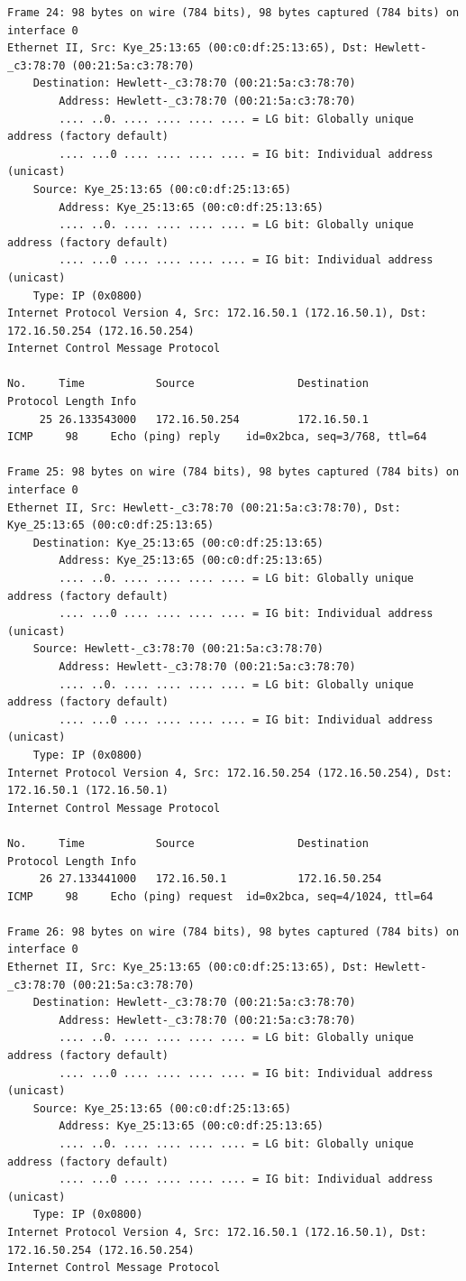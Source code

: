 \documentclass[a4paper,11pt]{article}
\begin{document}
\begin{lstlisting}
Frame 24: 98 bytes on wire (784 bits), 98 bytes captured (784 bits) on interface 0
Ethernet II, Src: Kye_25:13:65 (00:c0:df:25:13:65), Dst: Hewlett-_c3:78:70 (00:21:5a:c3:78:70)
    Destination: Hewlett-_c3:78:70 (00:21:5a:c3:78:70)
        Address: Hewlett-_c3:78:70 (00:21:5a:c3:78:70)
        .... ..0. .... .... .... .... = LG bit: Globally unique address (factory default)
        .... ...0 .... .... .... .... = IG bit: Individual address (unicast)
    Source: Kye_25:13:65 (00:c0:df:25:13:65)
        Address: Kye_25:13:65 (00:c0:df:25:13:65)
        .... ..0. .... .... .... .... = LG bit: Globally unique address (factory default)
        .... ...0 .... .... .... .... = IG bit: Individual address (unicast)
    Type: IP (0x0800)
Internet Protocol Version 4, Src: 172.16.50.1 (172.16.50.1), Dst: 172.16.50.254 (172.16.50.254)
Internet Control Message Protocol

No.     Time           Source                Destination           Protocol Length Info
     25 26.133543000   172.16.50.254         172.16.50.1           ICMP     98     Echo (ping) reply    id=0x2bca, seq=3/768, ttl=64

Frame 25: 98 bytes on wire (784 bits), 98 bytes captured (784 bits) on interface 0
Ethernet II, Src: Hewlett-_c3:78:70 (00:21:5a:c3:78:70), Dst: Kye_25:13:65 (00:c0:df:25:13:65)
    Destination: Kye_25:13:65 (00:c0:df:25:13:65)
        Address: Kye_25:13:65 (00:c0:df:25:13:65)
        .... ..0. .... .... .... .... = LG bit: Globally unique address (factory default)
        .... ...0 .... .... .... .... = IG bit: Individual address (unicast)
    Source: Hewlett-_c3:78:70 (00:21:5a:c3:78:70)
        Address: Hewlett-_c3:78:70 (00:21:5a:c3:78:70)
        .... ..0. .... .... .... .... = LG bit: Globally unique address (factory default)
        .... ...0 .... .... .... .... = IG bit: Individual address (unicast)
    Type: IP (0x0800)
Internet Protocol Version 4, Src: 172.16.50.254 (172.16.50.254), Dst: 172.16.50.1 (172.16.50.1)
Internet Control Message Protocol

No.     Time           Source                Destination           Protocol Length Info
     26 27.133441000   172.16.50.1           172.16.50.254         ICMP     98     Echo (ping) request  id=0x2bca, seq=4/1024, ttl=64

Frame 26: 98 bytes on wire (784 bits), 98 bytes captured (784 bits) on interface 0
Ethernet II, Src: Kye_25:13:65 (00:c0:df:25:13:65), Dst: Hewlett-_c3:78:70 (00:21:5a:c3:78:70)
    Destination: Hewlett-_c3:78:70 (00:21:5a:c3:78:70)
        Address: Hewlett-_c3:78:70 (00:21:5a:c3:78:70)
        .... ..0. .... .... .... .... = LG bit: Globally unique address (factory default)
        .... ...0 .... .... .... .... = IG bit: Individual address (unicast)
    Source: Kye_25:13:65 (00:c0:df:25:13:65)
        Address: Kye_25:13:65 (00:c0:df:25:13:65)
        .... ..0. .... .... .... .... = LG bit: Globally unique address (factory default)
        .... ...0 .... .... .... .... = IG bit: Individual address (unicast)
    Type: IP (0x0800)
Internet Protocol Version 4, Src: 172.16.50.1 (172.16.50.1), Dst: 172.16.50.254 (172.16.50.254)
Internet Control Message Protocol


\end{lstlisting}
\end{document}
